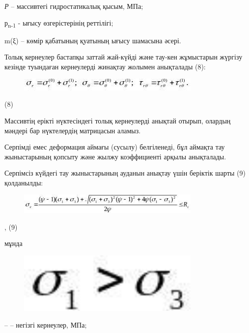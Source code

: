\emph{Р} -- массивтегі гидростатикалық қысым, МПа;

р\textsubscript{n-1} - ығысу өзгерістерінің реттілігі;

m(ξ) -- көмір қабатының қуатының ығысу шамасына әсері.

Толық кернеулер бастапқы заттай жай-күйді және тау-кен жұмыстарын
жүргізу кезінде туындаған кернеулерді жинақтау жолымен анықталады (8):

\begin{figure}[H]
	\centering
	\includegraphics[width=0.8\textwidth]{assets/1294}
	\caption*{}
\end{figure} (8)

Массивтің ерікті нүктесіндегі толық кернеулерді анықтай отырып, олардың
мәндері бар нүктелердің матрицасын аламыз.

Серпімді емес деформация аймағы (сусылу) белгіленеді, бұл аймақта тау
жыныстарының қопсыту және жылжу коэффициенті арқылы анықталады.

Серпімсіз күйдегі тау жыныстарының ауданын анықтау үшін беріктік шарты
(9) қолданылды:

\begin{figure}[H]
	\centering
	\includegraphics[width=0.8\textwidth]{assets/1295}
	\caption*{}
\end{figure}, (9)

мұнда \begin{figure}[H]
	\centering
	\includegraphics[width=0.8\textwidth]{assets/1296}
	\caption*{}
\end{figure} -- -- негізгі кернеулер, МПа;


